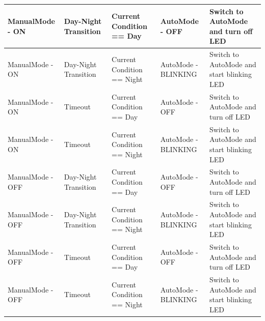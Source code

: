 \begin{table}[H]
\begin{tabular}{|p{2.3cm}|p{3cm}|p{4cm}|p{2cm}|p{4cm}|}
ManualMode - ON                                                     & Day-Night Transition                                       & Current Condition == Day                                       & AutoMode - OFF                                                  & Switch to AutoMode and turn off LED       \\ \hline
ManualMode - ON                                                     & Day-Night Transition                                       & Current Condition == Night                                     & AutoMode - BLINKING                                             & Switch to AutoMode and start blinking LED \\ \hline
ManualMode - ON                                                     & Timeout                                                    & Current Condition == Day                                       & AutoMode - OFF                                                  & Switch to AutoMode and turn off LED       \\ \hline
ManualMode - ON                                                     & Timeout                                                    & Current Condition == Night                                     & AutoMode - BLINKING                                             & Switch to AutoMode and start blinking LED \\ \hline
ManualMode - OFF                                                    & Day-Night Transition                                       & Current Condition == Day                                       & AutoMode - OFF                                                  & Switch to AutoMode and turn off LED       \\ \hline
ManualMode - OFF                                                    & Day-Night Transition                                       & Current Condition == Night                                     & AutoMode - BLINKING                                             & Switch to AutoMode and start blinking LED \\ \hline
ManualMode - OFF                                                    & Timeout                                                    & Current Condition == Day                                       & AutoMode - OFF                                                  & Switch to AutoMode and turn off LED       \\ \hline
ManualMode - OFF                                                    & Timeout                                                    & Current Condition == Night                                     & AutoMode - BLINKING                                             & Switch to AutoMode and start blinking LED \\ \hline

\end{tabular}
\end{table}

